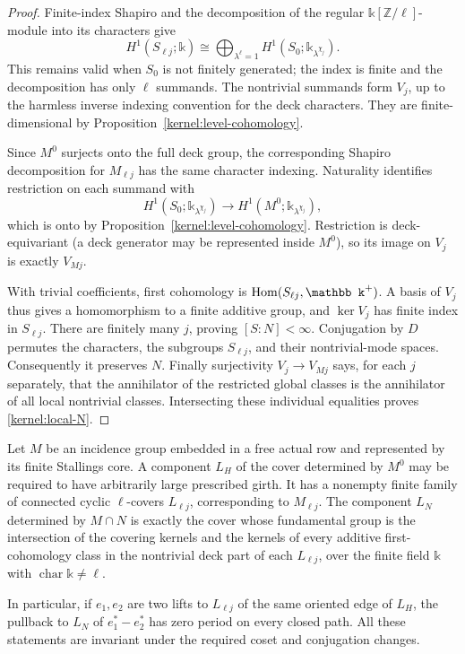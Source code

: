 \begin{proof}
Finite-index Shapiro and the decomposition of the regular
\(\mathbb k[\mathbb Z/\ell]\)-module into its characters give
\[
 H^1(S_{\ell j};\mathbb k)
       \cong
       \bigoplus_{\lambda^\ell=1}
                    H^1(S_0;\mathbb k_{\lambda^{\chi_j}}).
\]
This remains valid when \(S_0\) is not finitely generated; the index is
finite and the decomposition has only \(\ell\) summands.
The nontrivial summands form \(V_j\), up to the harmless inverse
indexing convention for the deck characters.  They are
finite-dimensional by Proposition~\ref{kernel:level-cohomology}.

Since \(M^0\) surjects onto the full deck group, the corresponding
Shapiro decomposition for \(M_{\ell j}\) has the same character
indexing.  Naturality identifies restriction on each summand with
\[
 H^1(S_0;\mathbb k_{\lambda^{\chi_j}})
                 \longrightarrow
 H^1(M^0;\mathbb k_{\lambda^{\chi_j}}),
\]
which is onto by Proposition~\ref{kernel:level-cohomology}.
Restriction is deck-equivariant (a deck generator may be represented
inside \(M^0\)), so its image on \(V_j\) is exactly \(V_{Mj}\).

With trivial coefficients, first cohomology is
\(\Hom(S_{\ell j},\mathbb k^+)\).  A basis of \(V_j\) thus gives a
homomorphism to a finite additive group, and \(\ker V_j\) has finite
index in \(S_{\ell j}\).  There are finitely many \(j\), proving
\([S:N]<\infty\).  Conjugation by \(D\) permutes the characters,
the subgroups \(S_{\ell j}\), and their nontrivial-mode spaces.
Consequently it preserves \(N\).
Finally surjectivity \(V_j\to V_{Mj}\) says, for each \(j\) separately,
that the annihilator of the restricted global classes is the
annihilator of all local nontrivial classes.  Intersecting these
individual equalities proves \eqref{kernel:local-N}.
\end{proof}

\begin{corollary}\label{kernel:graph-cover}
Let \(M\) be an incidence group embedded in a free actual row and
represented by its finite Stallings core.  A component \(L_H\) of the
cover determined by \(M^0\) may be required to have arbitrarily large
prescribed girth.  It has a nonempty finite family of connected cyclic
\(\ell\)-covers \(L_{\ell j}\), corresponding to \(M_{\ell j}\).
The component \(L_N\) determined by \(M\cap N\) is exactly the cover
whose fundamental group is the intersection of the covering kernels
and the kernels of every additive first-cohomology class in the
nontrivial deck part of each \(L_{\ell j}\), over the finite field
\(\mathbb k\) with \(\operatorname{char}\mathbb k\ne\ell\).

In particular, if \(e_1,e_2\) are two lifts to \(L_{\ell j}\) of the
same oriented edge of \(L_H\), the pullback to \(L_N\) of
\(e_1^*-e_2^*\) has zero period on every closed path.
All these statements are invariant under the required coset and
conjugation changes.
\end{corollary}

